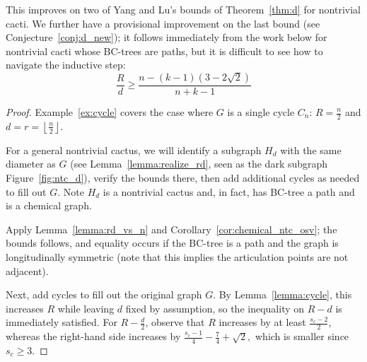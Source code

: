 \documentclass{amsart}
\theoremstyle{definition}
\begin{document}
This improves on two of Yang and Lu's bounds of Theorem~\ref{thm:d} for nontrivial cacti. We further have a provisional improvement on the last bound (see Conjecture~\ref{conj:d_new}); it follows immediately from the work below for nontrivial cacti whose BC-trees are paths, but it is difficult to see how to navigate the inductive step:
\[\frac{R}{d} \geq \frac{n - (k-1)(3-2\sqrt 2)}{n+k-1}\]


\begin{proof}
Example~\ref{ex:cycle} covers the case where $G$ is a single cycle $C_n$: $R=\frac{n}{2}$ and $d=r=\left\lfloor\frac{n}{2}\right\rfloor$. 

For a general nontrivial cactus, we will identify a subgraph $H_d$ with the same diameter as $G$ (see Lemma~\ref{lemma:realize_rd}, seen as the dark subgraph Figure~\ref{fig:ntc_d}), verify the bounds there, then add additional cycles as needed to fill out $G$. Note $H_d$ is a nontrivial cactus and, in fact, has BC-tree a path and is a chemical graph. 

Apply Lemma~\ref{lemma:rd_vs_n} and Corollary~\ref{cor:chemical_ntc_osv}; the bounds follows, and equality occurs if the BC-tree is a path and the graph is longitudinally symmetric (note that this implies the articulation points are not adjacent).

Next, add cycles to fill out the original graph $G$. By Lemma~\ref{lemma:cycle}, this increases $R$ while leaving $d$ fixed by assumption, so the inequality on $R-d$ is immediately satisfied. For $R-\frac{d}{2}$, observe that $R$ increases by at least $\frac{s_c-2}{2}$, whereas the right-hand side increases by $\frac{s_c-1}{4} - \frac{7}{4} + \sqrt 2,$ which is smaller since $s_c \geq 3$.
\end{proof}


\end{document}
